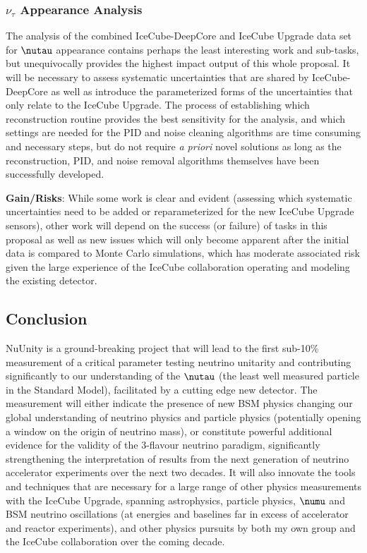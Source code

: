 \documentclass[a4paper,11pt]{article}
\begin{document}
\subsubsection{\texorpdfstring{$\nu_\tau$}{vt} Appearance Analysis}

The analysis of the combined IceCube-DeepCore and IceCube Upgrade data set for $\nutau$ appearance contains perhaps the least interesting work and sub-tasks, but unequivocally provides the highest impact output of this whole proposal. It will be necessary to assess systematic uncertainties that are shared by IceCube-DeepCore as well as introduce the parameterized forms of the uncertainties that only relate to the IceCube Upgrade. The process of establishing which reconstruction routine provides the best sensitivity for the analysis, and which settings are needed for the PID and noise cleaning algorithms are time consuming and necessary steps, but do not require \textit{a priori} novel solutions as long as the reconstruction, PID, and noise removal algorithms themselves have been successfully developed.  

\textbf{Gain/Risks}: While some work is clear and evident (assessing which systematic uncertainties need to be added or reparameterized for the new IceCube Upgrade sensors), other work will depend on the success (or failure) of tasks in this proposal as well as new issues which will only become apparent after the initial data is compared to Monte Carlo simulations, which has moderate associated risk given the large experience of the IceCube collaboration operating and modeling the existing detector.  

\subsection{Conclusion}
NuUnity is a ground-breaking project that will lead to the first sub-10\% measurement of a critical parameter testing neutrino unitarity and contributing significantly to our understanding of the $\nutau$ (the least well measured particle in the Standard Model), facilitated by a cutting edge new detector. The measurement will either indicate the presence of new BSM physics changing our global understanding of neutrino physics and particle physics (potentially opening a window on the origin of neutrino mass), or constitute powerful additional evidence for the validity of the 3-flavour neutrino paradigm, significantly strengthening the interpretation of results from the next generation of neutrino accelerator experiments over the next two decades. It will also innovate the tools and techniques that are necessary for a large range of other physics measurements with the IceCube Upgrade, spanning astrophysics, particle physics, $\numu$ and BSM neutrino oscillations (at energies and baselines far in excess of accelerator and reactor experiments), and other physics pursuits by both my own group and the IceCube collaboration over the coming decade. 
\end{document}
